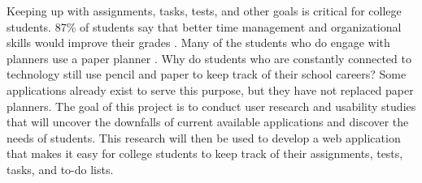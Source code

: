 %
%
Keeping up with assignments, tasks, tests, and other goals is critical for college students. 87\% of students say that better time management and organizational skills would improve their grades \cite{relplan}. Many of the students who do engage with planners use a paper planner \cite{mentor}. Why do students who are constantly connected to technology still use pencil and paper to keep track of their school careers? Some applications already exist to serve this purpose, but they have not replaced paper planners. The goal of this project is to conduct user research and usability studies that will uncover the downfalls of current available applications and discover the needs of students. This research will then be used to develop a web application that makes it easy for college students to keep track of their assignments, tests, tasks, and to-do lists.